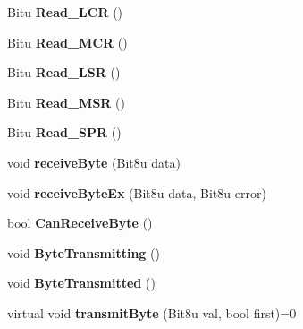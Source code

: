 \begin{DoxyCompactItemize}
\item 
\hypertarget{classCSerial_a9230f233f929e4f5b3154e662e3cb036}{Bitu {\bfseries Read\-\_\-\-L\-C\-R} ()}\label{classCSerial_a9230f233f929e4f5b3154e662e3cb036}

\item 
\hypertarget{classCSerial_aae3106549bad8f18adf37f1bacedbeff}{Bitu {\bfseries Read\-\_\-\-M\-C\-R} ()}\label{classCSerial_aae3106549bad8f18adf37f1bacedbeff}

\item 
\hypertarget{classCSerial_a2e52058acec7f6c4b85d6f0430abdae0}{Bitu {\bfseries Read\-\_\-\-L\-S\-R} ()}\label{classCSerial_a2e52058acec7f6c4b85d6f0430abdae0}

\item 
\hypertarget{classCSerial_a0e6ef678c9c62a8eb4ba407ad57a2d44}{Bitu {\bfseries Read\-\_\-\-M\-S\-R} ()}\label{classCSerial_a0e6ef678c9c62a8eb4ba407ad57a2d44}

\item 
\hypertarget{classCSerial_af1f36573bdc16f3510a75546f2d58a58}{Bitu {\bfseries Read\-\_\-\-S\-P\-R} ()}\label{classCSerial_af1f36573bdc16f3510a75546f2d58a58}

\item 
\hypertarget{classCSerial_a5a1977acc7ff580f49ac990783ed96b6}{void {\bfseries receive\-Byte} (Bit8u data)}\label{classCSerial_a5a1977acc7ff580f49ac990783ed96b6}

\item 
\hypertarget{classCSerial_afc7997bc5defdcb8c6c0a9ec094bf134}{void {\bfseries receive\-Byte\-Ex} (Bit8u data, Bit8u error)}\label{classCSerial_afc7997bc5defdcb8c6c0a9ec094bf134}

\item 
\hypertarget{classCSerial_a6005dc8c0bc391f28f32b73600da9877}{bool {\bfseries Can\-Receive\-Byte} ()}\label{classCSerial_a6005dc8c0bc391f28f32b73600da9877}

\item 
\hypertarget{classCSerial_a755578de0eeb57a61afee794d7cf6cab}{void {\bfseries Byte\-Transmitting} ()}\label{classCSerial_a755578de0eeb57a61afee794d7cf6cab}

\item 
\hypertarget{classCSerial_a1d24de2135b2cccc2733cf96f57203c7}{void {\bfseries Byte\-Transmitted} ()}\label{classCSerial_a1d24de2135b2cccc2733cf96f57203c7}

\item 
\hypertarget{classCSerial_a7a520bb7b440fb401858b04817911e40}{virtual void {\bfseries transmit\-Byte} (Bit8u val, bool first)=0}\label{classCSerial_a7a520bb7b440fb401858b04817911e40}


\end{DoxyCompactItemize}
